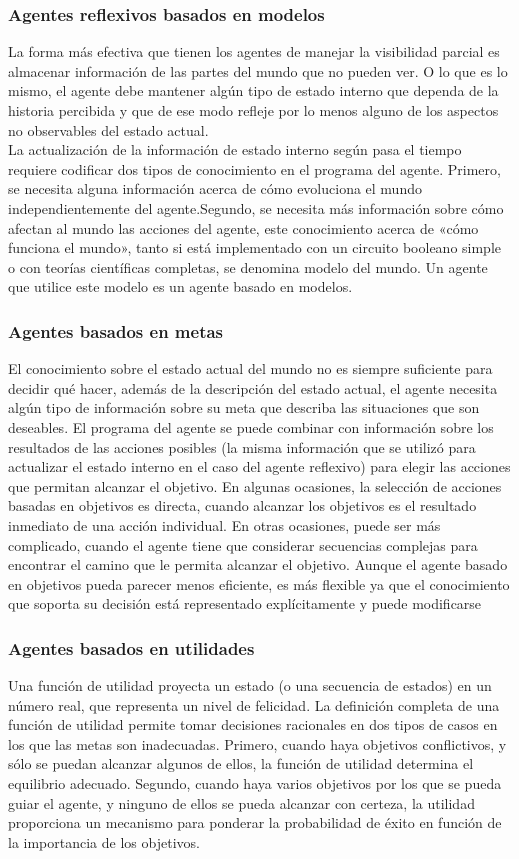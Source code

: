 \documentclass[12pt,a4paper]{report}
\begin{document}
\subsubsection{Agentes reflexivos basados en modelos}
La forma más efectiva que tienen los agentes de manejar la visibilidad parcial es almacenar información de las partes del mundo que no pueden ver. O lo que es lo mismo, el agente debe mantener algún tipo de estado interno que dependa de la historia percibida y que de ese modo refleje por lo menos alguno de los aspectos no observables del estado actual.\\La actualización de la información de estado interno según pasa el tiempo requiere codificar dos tipos de conocimiento en el programa del agente. Primero, se necesita alguna información acerca de cómo evoluciona el mundo independientemente del agente.Segundo, se necesita más información sobre cómo afectan al mundo las acciones del agente, este conocimiento acerca de «cómo funciona el mundo», tanto si está implementado con un circuito booleano simple o con teorías científicas completas, se denomina modelo del mundo. Un agente que utilice este modelo es un agente basado en modelos.
\subsubsection{Agentes basados en metas}
El conocimiento sobre el estado actual del mundo no es siempre suficiente para decidir qué hacer, además de la descripción del estado actual, el agente necesita algún tipo de información sobre su meta que describa las situaciones que son deseables. El programa del agente se puede combinar con información sobre los resultados de las acciones posibles (la misma información que se utilizó para actualizar el estado interno en el caso del agente reflexivo) para elegir las acciones que permitan alcanzar el objetivo. En algunas ocasiones, la selección de acciones basadas en objetivos es directa, cuando alcanzar los objetivos es el resultado inmediato de una acción individual. En otras ocasiones, puede ser más complicado, cuando el agente tiene que considerar secuencias complejas para encontrar el camino que le permita alcanzar el objetivo. Aunque el agente basado en objetivos pueda parecer menos eficiente, es más flexible ya que el conocimiento que soporta su decisión está representado explícitamente y puede modificarse
\subsubsection{Agentes basados en utilidades}
Una función de utilidad proyecta un estado (o una secuencia de estados) en un número real, que representa un nivel de felicidad. La definición completa de una función de utilidad permite tomar decisiones racionales en dos tipos de casos en los que las metas son inadecuadas. Primero, cuando haya objetivos conflictivos, y sólo se puedan alcanzar algunos de ellos, la función de utilidad determina el equilibrio adecuado. Segundo, cuando haya varios objetivos por los que se pueda guiar el agente, y ninguno de ellos se pueda alcanzar con certeza, la utilidad proporciona un mecanismo para ponderar la probabilidad de éxito en función de la importancia de los objetivos.
\end{document}
